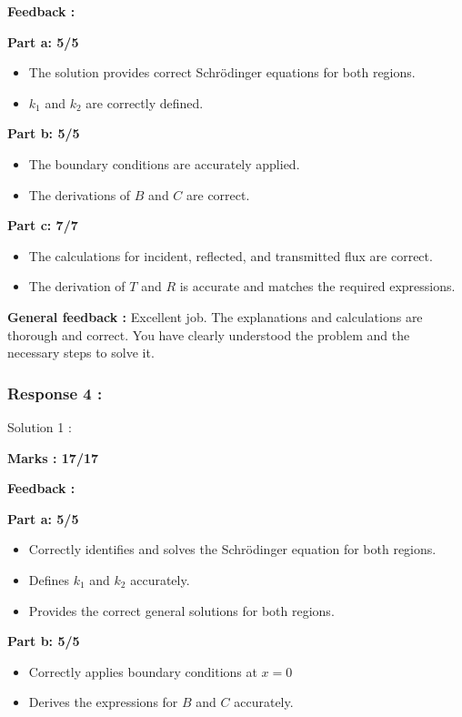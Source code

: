 \documentclass[a4paper,11pt]{article}
\begin{document}
\textbf{Feedback :}

\textbf{Part a: 5/5}
\begin{itemize}
    \item The solution provides correct Schrödinger equations for both regions.
    \item $k_1$ and $k_2$ are correctly defined.
\end{itemize}


\textbf{Part b: 5/5}
\begin{itemize}
    \item The boundary conditions are accurately applied.
    \item The derivations of $B$ and $C$ are correct.
\end{itemize}

\textbf{Part c: 7/7}
\begin{itemize}
    \item The calculations for incident, reflected, and transmitted flux are correct.
    \item The derivation of $T$ and $R$ is accurate and matches the required expressions.
\end{itemize}

\textbf{General feedback :}
Excellent job. The explanations and calculations are thorough and correct. You have clearly understood the problem and the necessary steps to solve it.


\subsubsection*{Response 4 :}


Solution 1 : 

\textbf{Marks : 17/17}

\textbf{Feedback :}

\textbf{Part a: 5/5}
\begin{itemize}
    \item Correctly identifies and solves the Schrödinger equation for both regions.
    \item Defines $k_1$ and $k_2$ accurately.
    \item Provides the correct general solutions for both regions.
\end{itemize}


\textbf{Part b: 5/5}
\begin{itemize}
    \item Correctly applies boundary conditions at $x = 0$
    \item Derives the expressions for $B$ and $C$ accurately.
\end{itemize}
\end{document}
